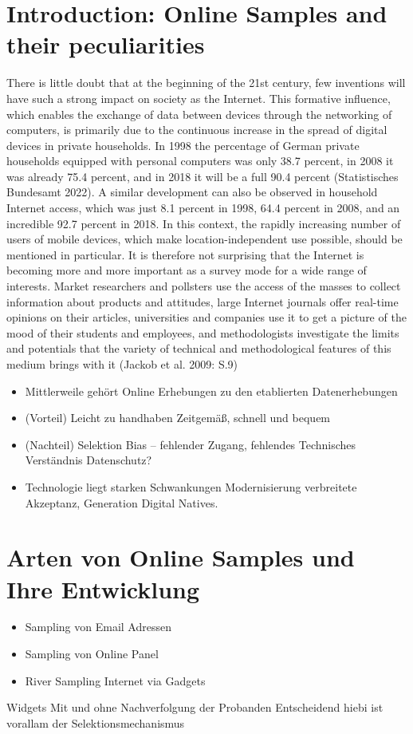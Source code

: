 \documentclass[a4paper , 11pt]{article}
\begin{document}
\section{Introduction: Online Samples and their peculiarities}

There is little doubt that at the beginning of the 21st century, few inventions will have such a strong impact on society as the Internet.
This formative influence, which enables the exchange of data between devices through the networking of computers, is primarily due to the continuous increase in the spread of digital devices in private households.
In 1998 the percentage of German private households equipped with personal computers was only 38.7 percent, in 2008 it was already 75.4 percent, and in 2018 it will be a full 90.4 percent (Statistisches Bundesamt 2022).
A similar development can also be observed in household Internet access, which was just 8.1 percent in 1998, 64.4 percent in 2008, and an incredible 92.7 percent in 2018.
In this context, the rapidly increasing number of users of mobile devices, which make location-independent use possible, should be mentioned in particular.
It is therefore not surprising that the Internet is becoming more and more important as a survey mode for a wide range of interests.
Market researchers and pollsters use the access of the masses to collect information about products and attitudes, large Internet journals offer real-time opinions on their articles, universities and companies use it to get a picture of the mood of their students and employees, and methodologists investigate the limits and potentials that the variety of technical and methodological features of this medium brings with it (Jackob et al. 2009: S.9)

\begin{itemize}
\item Mittlerweile gehört Online Erhebungen zu den etablierten Datenerhebungen
\item (Vorteil) Leicht zu handhaben Zeitgemäß, schnell und bequem
\item (Nachteil) Selektion Bias – fehlender Zugang, fehlendes Technisches Verständnis Datenschutz?
\item Technologie liegt starken Schwankungen Modernisierung verbreitete Akzeptanz, Generation Digital Natives.
\end{itemize}
\section{Arten von Online Samples und Ihre Entwicklung }
\begin{itemize}
\item Sampling von Email Adressen
\item Sampling von Online Panel
\item River Sampling Internet via Gadgets
\end{itemize}
Widgets
Mit und ohne Nachverfolgung der Probanden
Entscheidend hiebi ist vorallam der Selektionsmechanismus
\end{document}
